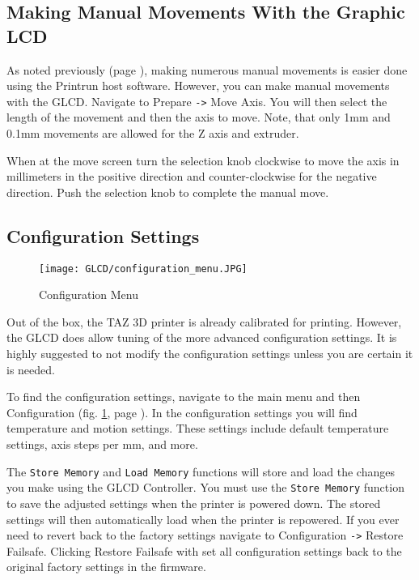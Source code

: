 \subsection{Making Manual Movements With the Graphic LCD}
As noted previously (page \pageref{sec:Graphic LCD or Printrun Host?}), making numerous manual movements is easier done using the Printrun host software. However, you can make manual movements with the GLCD. Navigate to Prepare \texttt{->} Move Axis. You will then select the length of the movement and then the axis to move. Note, that only 1mm and 0.1mm movements are allowed for the Z axis and extruder.

When at the move screen turn the selection knob clockwise to move the axis in millimeters in the positive direction and counter-clockwise for the negative direction. Push the selection knob to complete the manual move.

\subsection{Configuration Settings}

\begin{figure}[H]
\centering
\texttt{[image: GLCD/configuration\_menu.JPG]}
\caption{Configuration Menu}
\label{fig:configuration_menu}
\end{figure}

Out of the box, the TAZ 3D printer is already calibrated for printing. However, the GLCD does allow tuning of the more advanced configuration settings. It is highly suggested to not modify the configuration settings unless you are certain it is needed.

To find the configuration settings, navigate to the main menu and then Configuration (fig. \ref{fig:configuration_menu}, page \pageref{fig:configuration_menu}). In the configuration settings you will find temperature and motion settings. These settings include default temperature settings, axis steps per mm, and more.

The \texttt{Store Memory} and \texttt{Load Memory} functions will store and load the changes you make using the GLCD Controller. You must use the \texttt{Store Memory} function to save the adjusted settings when the printer is powered down. The stored settings will then automatically load when the printer is repowered. If you ever need to revert back to the factory settings navigate to Configuration \texttt{->} Restore Failsafe. Clicking Restore Failsafe with set all configuration settings back to the original factory settings in the firmware.


